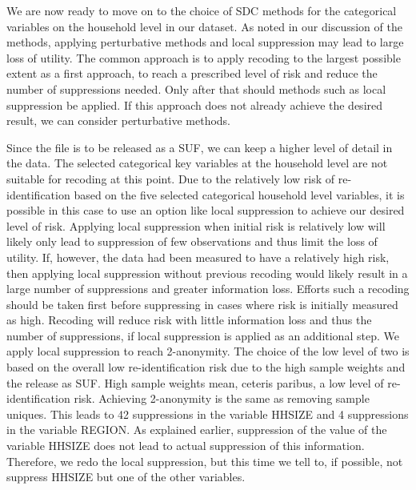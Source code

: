 \documentclass[letterpaper,10pt,english]{sphinxmanual}
\begin{document}

We are now ready to move on to the choice of SDC methods for the
categorical variables on the household level in our dataset. As noted in
our discussion of the methods, applying perturbative methods and local
suppression may lead to large loss of utility. The common approach is to
apply recoding to the largest possible extent as a first approach, to
reach a prescribed level of risk and reduce the number of suppressions
needed. Only after that should methods such as local suppression be
applied. If this approach does not already achieve the desired result,
we can consider perturbative methods.

Since the file is to be released as a SUF, we can keep a higher level of
detail in the data. The selected categorical key variables at the
household level are not suitable for recoding at this point. Due to the
relatively low risk of re-identification based on the five selected
categorical household level variables, it is possible in this case to
use an option like local suppression to achieve our desired level of
risk. Applying local suppression when initial risk is relatively low
will likely only lead to suppression of few observations and thus limit
the loss of utility. If, however, the data had been measured to have a
relatively high risk, then applying local suppression without previous
recoding would likely result in a large number of suppressions and
greater information loss. Efforts such a recoding should be taken first
before suppressing in cases where risk is initially measured as high.
Recoding will reduce risk with little information loss and thus the
number of suppressions, if local suppression is applied as an additional
step. We apply local suppression to reach 2-anonymity. The choice of the
low level of two is based on the overall low re-identification risk due
to the high sample weights and the release as SUF. High sample weights
mean, ceteris paribus, a low level of re-identification risk. Achieving
2-anonymity is the same as removing sample uniques. This leads to 42
suppressions in the variable HHSIZE and 4 suppressions in the variable
REGION. As explained earlier, suppression of the value of the variable
HHSIZE does not lead to actual suppression of this information.
Therefore, we redo the local suppression, but this time we tell
 to, if possible, not suppress HHSIZE but one of the other
variables.
\end{document}
